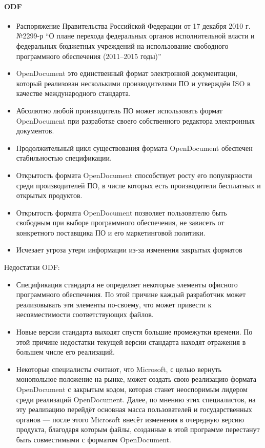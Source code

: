 \paragraph{ODF}\label{par:odf}
\begin{itemize}
    \item Распоряжение Правительства Российской Федерации от 17 декабря 2010 г. №2299-р \enquote{О плане перехода федеральных органов исполнительной власти и федеральных бюджетных учреждений на использование свободного программного обеспечения (2011--2015 годы)}
    \item OpenDocument это единственный формат электронной документации, который реализован несколькими производителями ПО и утверждён ISO в качестве международного стандарта.
    \item Абсолютно любой производитель ПО может использовать формат OpenDocument при разработке своего собственного редактора электронных документов.
    \item Продолжительный цикл существования формата OpenDocument обеспечен стабильностью спецификации.
    \item Открытость формата OpenDocument способствует росту его популярности среди производителей ПО, в числе которых есть производители бесплатных и открытых продуктов.
    \item Открытость формата OpenDocument позволяет пользователю быть свободным при выборе программного обеспечения, не зависеть от конкретного поставщика ПО и его маркетинговой политики.
    \item Исчезает угроза утери информации из-за изменения закрытых форматов
\end{itemize}

\noindent
Недостатки ODF:
\begin{itemize}
    \item Спецификация стандарта не определяет некоторые элементы офисного программного обеспечения. По этой причине каждый разработчик может реализовывать эти элементы по-своему, что может привести к несовместимости соответствующих файлов.
    \item Новые версии стандарта выходят спустя большие промежутки времени. По этой причине недостатки текущей версии стандарта находят отражения в большем числе его реализаций.
    \item Некоторые специалисты считают, что Microsoft, с целью вернуть монопольное положение на рынке, может создать свою реализацию формата OpenDocument с закрытым кодом, которая станет неоспоримым лидером среди реализаций OpenDocument. Далее, по мнению этих специалистов, на эту реализацию перейдёт основная масса пользователей и государственных органов --- после этого Microsoft внесёт изменения в очередную версию продукта, благодаря которым файлы, созданные в этой программе перестанут быть совместимыми с форматом OpenDocument.
\end{itemize}

